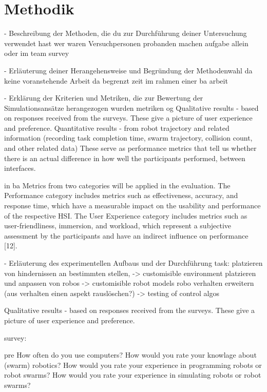 \documentclass[german,version-2020-11]{uzl-thesis}
\begin{document}
\section{Methodik}


- Beschreibung der Methoden, die du zur Durchführung deiner Untersuchung verwendet hast 
wer waren Versuchpersonen        
probanden machen aufgabe allein oder im team 
survey
      

      
- Erläuterung deiner Herangehensweise und Begründung der Methodenwahl 
da keine voranstehende Arbeit
da begrenzt zeit im rahmen einer ba arbeit
      
- Erklärung der Kriterien und Metriken, die zur Bewertung der Simulationsansätze herangezogen wurden
metriken
og
        Qualitative results - based on responses received from the surveys. 
          These give a picture of user experience and preference. 
        Quantitative results - from robot trajectory and related information 
          (recording task completion time, swarm trajectory, collision count, and other related data)
          These serve as performance metrics that tell us whether there is an actual difference in how well 
          the participants performed, between interfaces. 
          
      
      
        in ba
        Metrics from two categories will be applied in the evaluation. 
          The Performance category includes metrics such as effectiveness, accuracy, and response time, 
            which have a measurable impact on the usability and performance of the respective HSI. 
          The User Experience category includes metrics such as user-friendliness, immersion, and workload, 
            which represent a subjective assessment by the participants and have an indirect influence on performance [12].

- Erläuterung des experimentellen Aufbaus und der Durchführung 
task: 
platzieren von hindernissen an bestimmten stellen, -> customisible environment
platzieren und anpassen von robos -> customisible robot models
robo verhalten erweitern (aus verhalten einen aspekt rauslöschen?) -> testing of control algos


Qualitative results - based on responses received from the surveys. 
  These give a picture of user experience and preference. 

survey:
    
    pre
      How often do you use computers? 
      How would you rate your knowlage about (swarm) robotics?
      How would you rate your experience in programming robots or robot swarms?
      How would you rate your experience in simulating robots or robot swarms?
  
\end{document}
